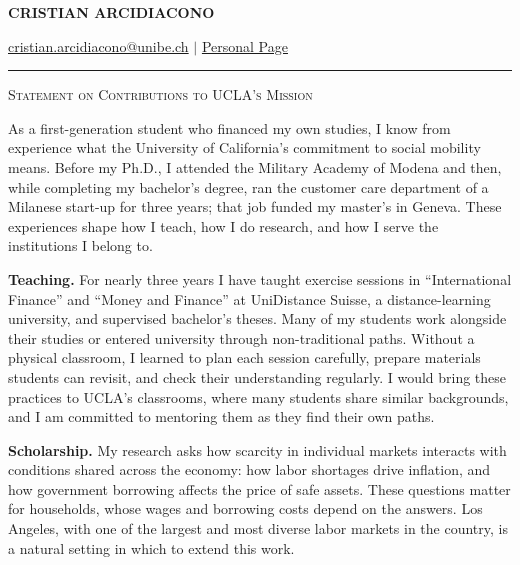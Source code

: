 \documentclass[11pt]{article}
\begin{document}
 
\begin{center}
    \textbf{\large \scshape CRISTIAN ARCIDIACONO}
\end{center}

\begin{center}
    {\href{mailto:cristian.arcidiacono@unibe.ch}{cristian.arcidiacono@unibe.ch} $\vert$ \href{https://sites.google.com/view/cristian-arcidiacono/home}{Personal Page}}
\end{center}
\vspace{-0.2cm}
\noindent\rule{\textwidth}{0.4pt}

\vspace{0.2cm}

\begin{center}
    {\large \scshape Statement on Contributions to UCLA's Mission}
\end{center}

\vspace{0.3cm}

As a first-generation student who financed my own studies, I know from experience what the University of California's commitment to social mobility means. Before my Ph.D., I attended the Military Academy of Modena and then, while completing my bachelor's degree, ran the customer care department of a Milanese start-up for three years; that job funded my master's in Geneva. These experiences shape how I teach, how I do research, and how I serve the institutions I belong to.

\textbf{Teaching.} For nearly three years I have taught exercise sessions in ``International Finance'' and ``Money and Finance'' at UniDistance Suisse, a distance-learning university, and supervised bachelor's theses. Many of my students work alongside their studies or entered university through non-traditional paths. Without a physical classroom, I learned to plan each session carefully, prepare materials students can revisit, and check their understanding regularly. I would bring these practices to UCLA's classrooms, where many students share similar backgrounds, and I am committed to mentoring them as they find their own paths.

\textbf{Scholarship.} My research asks how scarcity in individual markets interacts with conditions shared across the economy: how labor shortages drive inflation, and how government borrowing affects the price of safe assets. These questions matter for households, whose wages and borrowing costs depend on the answers. Los Angeles, with one of the largest and most diverse labor markets in the country, is a natural setting in which to extend this work.
\end{document}
